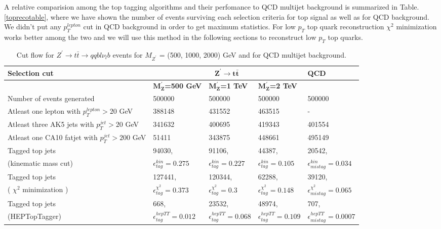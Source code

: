 \documentclass[12pt,a4paper]{article}		%
\begin{document}
A relative comparision among the top tagging algorithms and their perfomance to QCD multijet background is summarized in Table.\ref{toprecotable}, where we have shown the number of events surviving each selection criteria for top signal as well as for QCD background. We didn't put any $p_T^{lepton}$ cut in QCD background in order to get maximum statistics. For low $p_T$ top quark reconstruction $\chi^2$ minimization works better among the two and we will use this method in the following sections to reconstruct low $p_T$ top quarks.       	
  

\begin{table}[h!]
	\caption{ Cut flow for $Z^\prime \to t \bar{t} \to qqb l\nu_lb$ events for $M_{Z^\prime}$ = (500, 1000, 2000) GeV and for QCD multijet background.   }
	\centering
\begin{tabular}{ |p{5cm}|p{3cm}|p{3cm}|p{3cm}|p{3cm}| }
	\hline
	\textbf{Selection cut}&\multicolumn{3}{|c|}{ $ \mathbf{Z^\prime \to t \bar{t}} $   } & \textbf{QCD} \\
	\hline
	&  $\mathbf{M_Z^\prime}$\textbf{=500 GeV}  & $\mathbf{M_Z^\prime}$\textbf{=1 TeV}&$\mathbf{M_Z^\prime}$\textbf{=2 TeV} & \\
	\hline
	  Number of events generated   & 500000 & 500000 & 500000 & 500000 \\
	\hline
	Atleast one lepton with        $p_T^{lepton} > 20$ GeV & 388148 & 431552 & 463515 & - \\
	\hline
	Atleast three AK5 jets with        $p_T^{jet} > 20$ GeV & 341632 & 400695 & 419343 & 401554 \\
	\hline
	Atleast one CA10 fatjet with        $p_T^{jet} > 200$ GeV & 51411 & 343875 & 448661 & 495149 \\
	\hline
	Tagged top jets       & 94030, & 91106, & 44387, & 20542, \\
	(kinematic mass cut)  & $\epsilon_{tag}^{kin} = 0.275$ & $\epsilon_{tag}^{kin} = 0.227$ & $\epsilon_{tag}^{kin} = 0.105$ & $\epsilon_{mistag}^{kin} = 0.034$  \\
	\hline
	Tagged top jets       & 127441, & 120344, & 62288, & 39120, \\
	( $\chi^2$ minimization )  & $\epsilon_{tag}^{\chi^2} = 0.373$ & $\epsilon_{tag}^{\chi^2} = 0.3$ & $\epsilon_{tag}^{\chi^2} = 0.148$ & $\epsilon_{mistag}^{\chi^2} = 0.065$ \\
	\hline
	Tagged top jets       & 668, & 23532, & 48974, & 707, \\
	(HEPTopTagger)  & $\epsilon_{tag}^{hepTT} = 0.012$ & $\epsilon_{tag}^{hepTT} = 0.068$ & $\epsilon_{tag}^{hepTT} = 0.109$ & $\epsilon_{mistag}^{hepTT} = 0.0007$ \\

\end{tabular}
\end{table}
\end{document}
